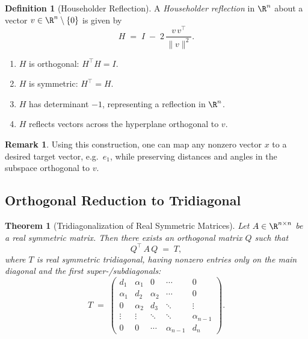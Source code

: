 \documentclass[letterpaper,11pt,oneside,reqno]{article}
\numberwithin{equation}{section}
\newtheorem{theorem}[proposition]{Theorem}
\theoremstyle{definition}
\newtheorem{definition}[proposition]{Definition}
\newtheorem{remark}[proposition]{Remark}
\begin{document}
\begin{definition}[Householder Reflection]
A \emph{Householder reflection} in $\R^n$ about a vector $v \in \R^n \setminus\{0\}$ is given by
\[
  H \;=\;
  I \;-\; 2\,\frac{v\,v^\top}{\|v\|^2}.
\]
\begin{enumerate}[(1)]
\item $H$ is orthogonal: $H^\top H = I$.
\item $H$ is symmetric: $H^\top = H$.
\item $H$ has determinant $-1$, representing a reflection in $\R^n$.
\item $H$ reflects vectors across the hyperplane orthogonal to $v$.
\end{enumerate}
\end{definition}

\begin{remark}
Using this construction, one can map any nonzero vector $x$ to a desired target vector, e.g.\ $e_1$, while preserving distances and angles in the subspace orthogonal to $v$.
\end{remark}

\subsection{Orthogonal Reduction to Tridiagonal}

\begin{theorem}[Tridiagonalization of Real Symmetric Matrices]
\label{thm:tridiagonal}
Let $A\in \R^{n\times n}$ be a real symmetric matrix. Then there exists an orthogonal matrix $Q$ such that
\[
  Q^\top\,A\,Q \;=\; T,
\]
where $T$ is real symmetric \emph{tridiagonal}, having nonzero entries only on the main diagonal and the first super-/subdiagonals:
\[
  T \;=\;
  \begin{pmatrix}
     d_1 & \alpha_1 & 0 & \cdots & 0\\
     \alpha_1 & d_2 & \alpha_2 & \cdots & 0\\
     0 & \alpha_2 & d_3 & \ddots & \vdots\\
     \vdots & \vdots & \ddots & \ddots & \alpha_{n-1}\\
     0 & 0 & \cdots & \alpha_{n-1} & d_n
  \end{pmatrix}.
\]
\end{theorem}
\end{document}
